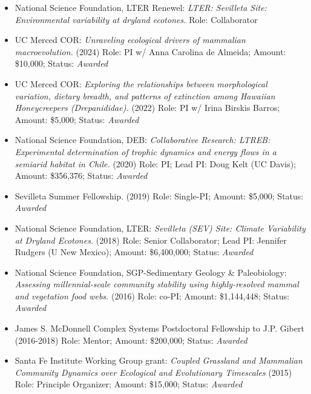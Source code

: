 \documentclass[margin,line,12pt]{res}
\begin{document}
\begin{resume}
\begin{itemize}
\item National Science Foundation, LTER Renewel: \emph{LTER: Sevilleta Site: Environmental variability at dryland ecotones.} Role: Collaborator

\item UC Merced COR: \emph{Unraveling ecological drivers of mammalian macroevolution.} (2024) Role: PI w/ Anna Carolina de Almeida; Amount: \$10,000; Status: \emph{Awarded}

\item UC Merced COR: \emph{Exploring the relationships between morphological variation, dietary breadth, and patterns of extinction among Hawaiian Honeycreepers (Drepanididae).} (2022) Role: PI w/ Irina Birskis Barros; Amount: \$5,000; Status: \emph{Awarded}
  
\item National Science Foundation, DEB: \emph{Collaborative Research: LTREB: Experimental determination of trophic dynamics and energy flows in a semiarid habitat in Chile.} (2020) Role: PI; Lead PI: Doug Kelt (UC Davis); Amount: \$356,376; Status: \emph{Awarded}

\item Sevilleta Summer Fellowship. (2019) Role: Single-PI; Amount: \$5,000; Status: \emph{Awarded}

\item National Science Foundation, LTER: \emph{Sevilleta (SEV) Site: Climate Variability at Dryland Ecotones.} (2018) Role: Senior Collaborator; Lead PI: Jennifer Rudgers (U New Mexico); Amount: \$6,400,000; Status: \emph{Awarded}

\item National Science Foundation, SGP-Sedimentary Geology \& Paleobiology: \emph{Assessing millennial-scale community stability using highly-resolved mammal and vegetation food webs.} (2016) Role: co-PI; Amount: \$1,144,448; Status: \emph{Awarded}

\item James S. McDonnell Complex Systems Postdoctoral Fellowship to J.P. Gibert (2016-2018) Role: Mentor; Amount: \$200,000; Status: \emph{Awarded}

\item Santa Fe Institute Working Group grant: \emph{Coupled Grassland and Mammalian Community Dynamics over Ecological and Evolutionary Timescales} (2015) Role: Principle Organizer; Amount: \$15,000; Status: \emph{Awarded}


\end{itemize}
\end{resume}
\end{document}
